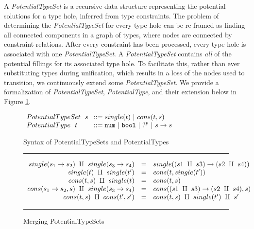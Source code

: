 A \textit{PotentialTypeSet} is a recursive data structure representing the potential solutions for a type hole, inferred from type constraints. The problem of determining the \textit{PotentialTypeSet} for every type hole can be re-framed as finding all connected components in a graph of types, where nodes are connected by constraint relations. After every constraint has been processed, every type hole is associated with one \textit{PotentialTypeSet}. A \emph{PotentialTypeSet} contains \emph{all} of the potential fillings for its associated type hole. To facilitate this, rather than ever substituting types during unification, which results in a loss of the nodes used to transition, we continuously extend some \emph{PotentialTypeSet}. We provide a formalization of \textit{PotentialTypeSet}, \textit{PotentialType}, and their extension below in Figure \ref{fig:possible_type_sets}.

\begin{figure}[h!]
\centering
\vspace{-3px} 
$\arraycolsep=4pt\begin{array}{lll}
PotentialTypeSet~~ s & ::= 
single(t) ~\vert~ 
cons(t, s)
\\
PotentialType~~ t & ::= 
  \tnum ~\vert~
  \tbool ~\vert~
  \tehole^p ~\vert~
  \tarr{s}{s}
  \\
\end{array}$
\label{fig:syntax_possible_type_sets}
\caption{Syntax of PotentialTypeSets and PotentialTypes}
\vspace{5px}
\hrule
\[\begin{array}{rcl}
    single(s_1 \rightarrow s_2) ~\amalg~ single(s_3 \rightarrow s_4) & = & single({(s1 ~\amalg~ s3) \rightarrow (s2 ~\amalg~ s4)}) \\
    single(t) ~\amalg~ single(t') & = & cons(t, single(t')) \\
    cons(t,s) ~\amalg~ single(t) & = & cons(t, s) \\
    cons(s_1 \rightarrow s_2, s) ~\amalg~ single(s_3 \rightarrow s_4) & = & cons((s1 ~\amalg~ s3) \rightarrow (s2 ~\amalg~ s4) , s) \\
    cons(t,s) ~\amalg~ cons(t',s') & = & cons(t,s) ~\amalg~ single(t') ~\amalg~ s' \\
\end{array}\] 
\caption{Merging PotentialTypeSets}
\vspace{5px} 
\hrule
\label{fig:possible_type_sets}
\vspace{-5px}
\end{figure}

